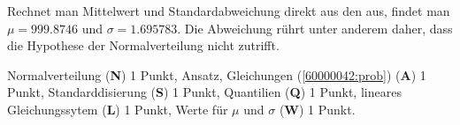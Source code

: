 \begin{diskussion}
Rechnet man Mittelwert und Standardabweichung direkt aus den aus, findet man
$\mu=999.8746$ und $\sigma=1.695783$.
Die Abweichung rührt unter anderem daher, dass die Hypothese der
Normalverteilung nicht zutrifft.
\end{diskussion}

\begin{bewertung}
Normalverteilung ({\bf N}) 1 Punkt,
Ansatz, Gleichungen (\ref{60000042:prob}) ({\bf A}) 1 Punkt,
Standarddisierung ({\bf S}) 1 Punkt,
Quantilien ({\bf Q}) 1 Punkt,
lineares Gleichungssytem ({\bf L}) 1 Punkt,
Werte für $\mu$ und $\sigma$ ({\bf W}) 1 Punkt.
\end{bewertung}

